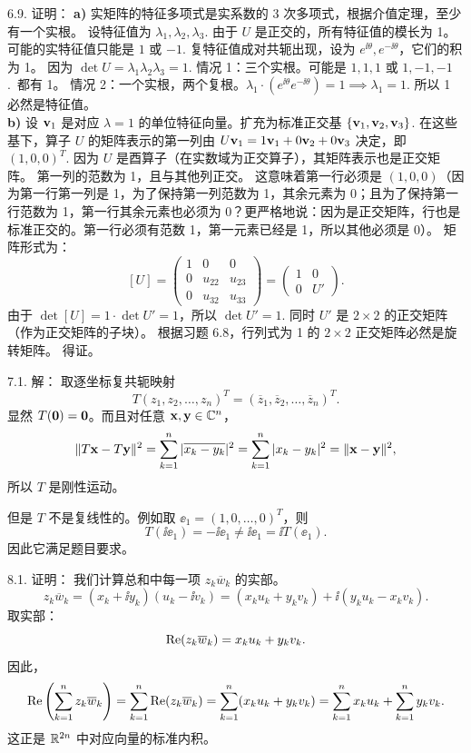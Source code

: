 \begin{exer}
6.9. 证明：
\textbf{a)}
实矩阵的特征多项式是实系数的 3 次多项式，根据介值定理，至少有一个实根。
设特征值为 $\lambda_1, \lambda_2, \lambda_3$.
由于 $U$ 是正交的，所有特征值的模长为 1。
可能的实特征值只能是 $1$ 或 $-1$.
复特征值成对共轭出现，设为 $e^{\ii \theta}, e^{-\ii \theta}$，它们的积为 1。
因为 $\det U = \lambda_1 \lambda_2 \lambda_3 = 1$.
情况 1：三个实根。可能是 $1, 1, 1$ 或 $1, -1, -1$.~都有 1。
情况 2：一个实根，两个复根。$\lambda_1 \cdot (e^{\ii \theta} e^{-\ii \theta}) = 1 \implies \lambda_1 = 1$.
所以 1 必然是特征值。
\\
\textbf{b)}
设 $\mathbf{v}_1$ 是对应 $\lambda=1$ 的单位特征向量。扩充为标准正交基 $\{\mathbf{v}_1, \mathbf{v}_2, \mathbf{v}_3\}$.
在这些基下，算子 $U$ 的矩阵表示的第一列由 $U\mathbf{v}_1 = 1\mathbf{v}_1 + 0\mathbf{v}_2 + 0\mathbf{v}_3$ 决定，即 $(1, 0, 0)^T$.
因为 $U$ 是酉算子（在实数域为正交算子），其矩阵表示也是正交矩阵。
第一列的范数为 1，且与其他列正交。
这意味着第一行必须是 $(1, 0, 0)$（因为第一行第一列是 1，为了保持第一列范数为 1，其余元素为 0；且为了保持第一行范数为 1，第一行其余元素也必须为 0？更严格地说：因为是正交矩阵，行也是标准正交的。第一行必须有范数 1，第一元素已经是 1，所以其他必须是 0）。
矩阵形式为：
$$ [U] = \begin{pmatrix} 1 & 0 & 0 \\ 0 & u_{22} & u_{23} \\ 0 & u_{32} & u_{33} \end{pmatrix} = \begin{pmatrix} 1 & 0 \\ 0 & U' \end{pmatrix}. $$
由于 $\det [U] = 1 \cdot \det U' = 1$，所以 $\det U' = 1$.
同时 $U'$ 是 $2 \times 2$ 的正交矩阵（作为正交矩阵的子块）。
根据习题 6.8，行列式为 1 的 $2 \times 2$ 正交矩阵必然是旋转矩阵。
得证。


\vspace{5ex}

7.1. 解：
取逐坐标复共轭映射
$$
T(z_1,z_2,\dots,z_n)^T=(\overline z_1,\overline z_2,\dots,\overline z_n)^T.
$$
显然 $T(\mathbf{0})=\mathbf{0}$。而且对任意 $\mathbf{x},\mathbf{y}\in\mathbb{C}^n$，
$$
\|T\mathbf{x}-T\mathbf{y}\|^2
=\sum_{k=1}^n |\overline{x_k-y_k}|^2
=\sum_{k=1}^n |x_k-y_k|^2
=\|\mathbf{x}-\mathbf{y}\|^2,
$$
所以 $T$ 是刚性运动。

但是 $T$ 不是复线性的。例如取 $\ee_1=(1,0,\dots,0)^T$，则
$$
T(\ii\ee_1)=-\ii\ee_1\neq \ii\ee_1=\ii T(\ee_1).
$$
因此它满足题目要求。

\vspace{5ex}

8.1. 证明：
我们计算总和中每一项 $z_k \overline{w}_k$ 的实部。
$$ z_k \overline{w}_k = (x_k + \ii y_k)(u_k - \ii v_k) = (x_k u_k + y_k v_k) + \ii (y_k u_k - x_k v_k). $$
取实部：
$$ \operatorname{Re}(z_k \overline{w}_k) = x_k u_k + y_k v_k. $$
因此，
$$ \operatorname{Re}\left(\sum_{k=1}^n z_k \overline{w}_k\right) = \sum_{k=1}^n \operatorname{Re}(z_k \overline{w}_k) = \sum_{k=1}^n (x_k u_k + y_k v_k) = \sum_{k=1}^n x_k u_k + \sum_{k=1}^n y_k v_k. $$
这正是 $\mathbb{R}^{2n}$ 中对应向量的标准内积。


\end{exer}
